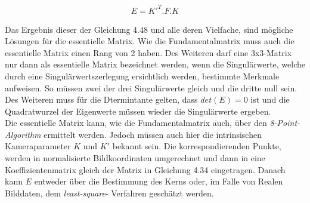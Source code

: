 \begin{gather}
E = K'^T.F.K
\end{gather}

Das Ergebnis dieser der Gleichung 4.48 und alle deren Vielfache, sind mögliche Lösungen für die essentielle Matrix. Wie die Fundamentalmatrix muss auch die essentielle Matrix einen Rang von 2 haben. Des Weiteren darf eine 3x3-Matrix nur dann als essentielle Matrix bezeichnet werden, wenn die Singulärwerte, welche durch eine Singulärwertszerlegung ersichtlich werden, bestimmte Merkmale aufweisen. So müssen zwei der drei Singulärwerte gleich und die dritte null sein\cite{HZ}. Des Weiteren muss für die Dtermintante gelten, dass $det(E) = 0$ ist und die Quadratwurzel der Eigenwerte müssen wieder die Singulärwerte ergeben. \\

Die essentielle Matrix kann, wie die Fundamentalmatrix auch, über den \textit{8-Point-Algorithm} ermittelt werden. Jedoch müssen auch hier die intrinsischen Kameraparameter $K$ und $K'$ bekannt sein. Die korrespondierenden Punkte, werden in normalisierte Bildkoordinaten umgerechnet und dann in eine Koeffizientenmatrix gleich der Matrix in Gleichung 4.34 eingetragen. Danach kann $E$ entweder über die Bestimmung des Kerns oder, im Falle von Realen Bilddaten, dem \textit{least-square}- Verfahren geschätzt werden\cite{HZ,Ferid}.

%
%
%

